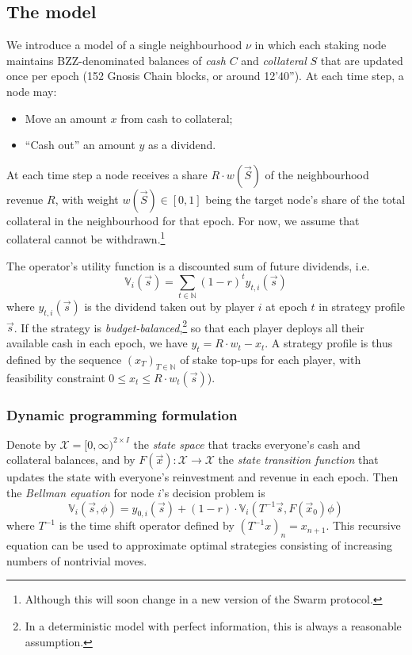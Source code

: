 \subsection*{The model}

We introduce a model of a single neighbourhood $\nu$ in which each staking node maintains BZZ-denominated balances of \emph{cash} $C$ and \emph{collateral} $S$ that are updated once per epoch (152 Gnosis Chain blocks, or around 12'40''). At each time step, a node may:

\begin{itemize}
\item Move an amount $x$ from cash to collateral;
\item ``Cash out'' an amount $y$ as a dividend.
\end{itemize}
%
At each time step a node receives a share $R\cdot w(\vec{S})$ of the neighbourhood revenue $R$, with weight $w(\vec{S})\in[0,1]$ being the target node's share of the total collateral in the neighbourhood for that epoch. For now, we assume that collateral cannot be withdrawn.\footnote{Although this will soon change in a new version of the Swarm protocol.}

The operator's utility function is a discounted sum of future dividends, i.e.
\[
  \mathbb{V}_i(\vec{s}) = \sum_{t\in\mathbb{N}}(1-r)^t y_{t,i}(\vec{s})
\]
where $y_{t,i}(\vec{s})$ is the dividend taken out by player $i$ at epoch $t$ in strategy profile $\vec{s}$. 
%
If the strategy is \emph{budget-balanced},\footnote{In a deterministic model with perfect information, this is always a reasonable assumption.} so that each player deploys all their available cash in each epoch, we have $y_t = R\cdot w_t - x_t$. 
%
A strategy profile is thus defined by the sequence $(x_T)_{T\in\mathbb{N}}$ of stake top-ups for each player, with feasibility constraint $0\leq x_t\leq R\cdot w_t(\vec{s})$).

\subsubsection*{Dynamic programming formulation}

Denote by $\mathcal{X} = [0,\infty)^{2\times I}$ the \emph{state space} that tracks everyone's cash and collateral balances, and by $F(\vec{x}):\mathcal{X}\rightarrow\mathcal{X}$ the \emph{state transition function} that updates the state with everyone's reinvestment and revenue in each epoch. Then the \emph{Bellman equation} for node $i$'s decision problem is
%
\begin{equation}
  \mathbb{V}_i(\vec{s},\phi) = y_{0,i}(\vec{s}) + 
    (1-r)\cdot\mathbb{V}_i(T^{-1}\vec{s}, F(\vec{x}_0)\phi)
\end{equation}
%
where $T^{-1}$ is the time shift operator defined by $(T^{-1}x)_n = x_{n+1}$. This recursive equation can be used to approximate optimal strategies consisting of increasing numbers of nontrivial moves.

